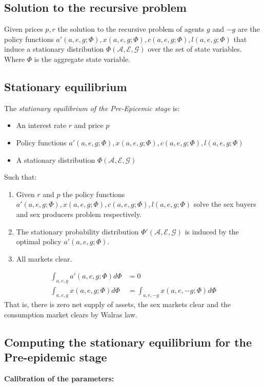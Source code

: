  \subsection*{Solution to the recursive problem}
 Given prices $p,r$ the solution to the recursive problem of agents $g$ and $-g$  are the policy functions $a'(a,e,g;\Phi), x(a,e,g;\Phi), c(a,e,g;\Phi), l(a,e,g;\Phi)$ that induce a stationary distribution $\Phi(\mathcal{A,E,G})$ over the set of state variables. Where $\Phi$ is the aggregate state variable.
 \subsection*{Stationary equilibrium}
 The \textit{stationary equilibrium of the Pre-Epicemic stage} is:
 \begin{itemize}
 \item An interest rate $r$ and price $p$
 \item Policy functions $a'(a,e,g;\Phi), x(a,e,g;\Phi), c(a,e,g;\Phi), l(a,e,g;\Phi)$
 \item A stationary distribution $\Phi(\mathcal{A},\mathcal{E},\mathcal{G}) $
 \end{itemize}
 Such that:
 \begin{enumerate}[label=\alph*]
 \item Given $r$ and $p$ the policy functions  $a'(a,e,g;\Phi), x(a,e,g;\Phi), c(a,e,g;\Phi), l(a,e,g;\Phi)$ solve the sex buyers and sex producers problem respectively. 
 \item The stationary probability distribution $\Phi'(\mathcal{A},\mathcal{E},\mathcal{G})$ is induced by the optimal policy $a'(a,e,g;\Phi)$.
 \item All markets clear. 
  \end{enumerate}
 \begin{align*}
\int_{a,e,g} a'(a,e,g;\Phi) d\Phi &= 0 \\
\int_{a,e,g} x(a,e,g;\Phi) d \Phi &= \int_{a,e,-g} x(a,e,-g;\Phi) d\Phi
\end{align*} 
That is, there is zero net supply of assets, the sex markets clear and the consumption market clears by Walras law. 
\subsection*{Computing the stationary equilibrium for the Pre-epidemic stage}
\noindent \textbf{Calibration of the parameters:}\\
\\

